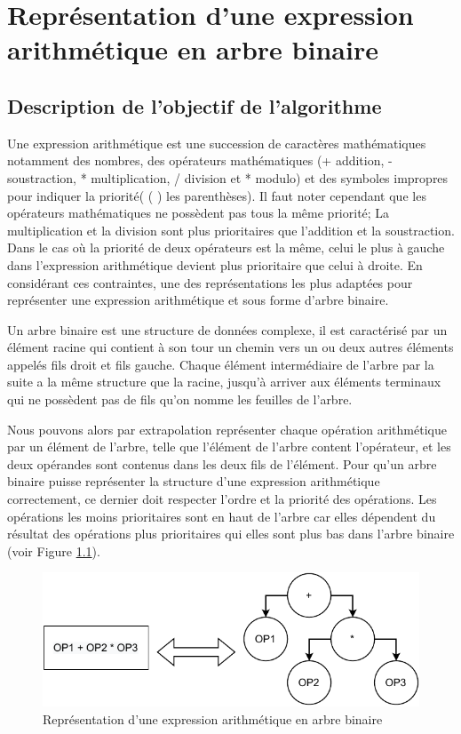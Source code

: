 \chapter{Représentation d'une expression arithmétique en arbre binaire}

\section{Description de l'objectif de l'algorithme}
Une expression arithmétique est une succession de caractères mathématiques notamment des nombres, des opérateurs mathématiques (+ addition, - soustraction, * multiplication, / division et * modulo) et des symboles impropres pour indiquer la priorité( ( ) les parenthèses).
Il faut noter cependant que les opérateurs mathématiques ne possèdent pas tous la même priorité; La multiplication et la division sont plus prioritaires que l'addition et la soustraction.
Dans le cas où la priorité de deux opérateurs est la même, celui le plus à gauche dans l'expression arithmétique devient plus prioritaire que celui à droite.
En considérant ces contraintes, une des représentations les plus adaptées pour représenter une expression arithmétique et sous forme d'arbre binaire.
\par
Un arbre binaire est une structure de données complexe, il est caractérisé par un élément racine qui contient à son tour un chemin vers un ou deux autres éléments appelés fils droit et fils gauche. Chaque élément intermédiaire de l'arbre par la suite a la même structure que la racine, jusqu'à arriver aux éléments terminaux qui ne possèdent pas de fils qu'on nomme les feuilles de l'arbre.
\par
Nous pouvons alors par extrapolation représenter chaque opération arithmétique par un élément de l'arbre, telle que l'élément de l'arbre content l'opérateur, et les deux opérandes sont contenus dans les deux fils de l'élément.
Pour qu'un arbre binaire puisse représenter la structure d'une expression arithmétique correctement, ce dernier doit respecter l'ordre et la priorité des opérations. Les opérations les moins prioritaires sont en haut de l'arbre car elles dépendent du résultat des opérations plus prioritaires qui elles sont plus bas dans l'arbre binaire (voir Figure \ref{fig:exp_arbre}).

\begin{figure}[H]
    \centering
        \includegraphics[scale=1.0]{./ressources/expression_to_tree.pdf}
        \caption{Représentation d'une expression arithmétique en arbre binaire}
    \label{fig:exp_arbre}
\end{figure}

